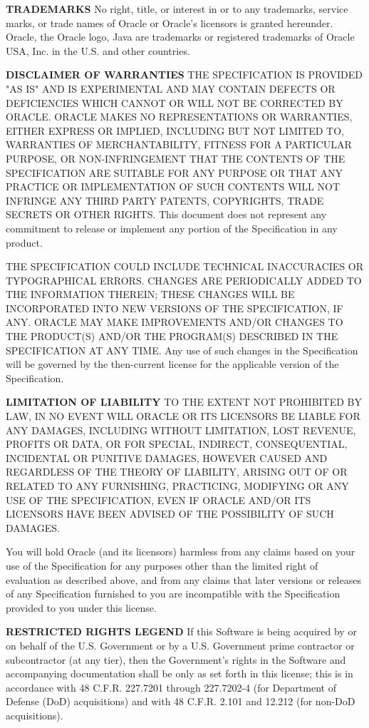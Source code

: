 \begin{flushleft}
{\bfseries TRADEMARKS}
No right, title, or interest in or to any trademarks, service marks, or trade names of Oracle or Oracle's licensors is granted hereunder. Oracle, the Oracle logo, Java are trademarks or registered trademarks of Oracle USA, Inc. in the U.S. and other countries.

{\bfseries DISCLAIMER OF WARRANTIES}
THE SPECIFICATION IS PROVIDED "AS IS" AND IS EXPERIMENTAL AND MAY CONTAIN DEFECTS OR DEFICIENCIES WHICH CANNOT OR WILL NOT BE CORRECTED BY ORACLE. ORACLE MAKES NO REPRESENTATIONS OR WARRANTIES, EITHER EXPRESS OR IMPLIED, INCLUDING BUT NOT LIMITED TO, WARRANTIES OF MERCHANTABILITY, FITNESS FOR A PARTICULAR PURPOSE, OR NON-INFRINGEMENT THAT THE CONTENTS OF THE SPECIFICATION ARE
SUITABLE FOR ANY PURPOSE OR THAT ANY PRACTICE OR IMPLEMENTATION OF SUCH CONTENTS WILL NOT INFRINGE ANY THIRD PARTY PATENTS, COPYRIGHTS, TRADE SECRETS OR OTHER RIGHTS. This document does not represent any commitment to release or implement any portion of the Specification in any product.

THE SPECIFICATION COULD INCLUDE TECHNICAL INACCURACIES OR TYPOGRAPHICAL ERRORS. CHANGES ARE PERIODICALLY ADDED TO THE INFORMATION THEREIN; THESE CHANGES WILL BE INCORPORATED INTO NEW VERSIONS OF THE SPECIFICATION, IF ANY. ORACLE MAY MAKE IMPROVEMENTS AND/OR CHANGES TO THE PRODUCT(S) AND/OR THE PROGRAM(S) DESCRIBED IN THE SPECIFICATION AT ANY TIME. Any use of such changes in the Specification will be governed by the then-current license for the applicable version of the Specification.

{\bfseries LIMITATION OF LIABILITY}
TO THE EXTENT NOT PROHIBITED BY LAW, IN NO EVENT WILL ORACLE OR ITS LICENSORS BE LIABLE FOR ANY DAMAGES, INCLUDING WITHOUT LIMITATION, LOST REVENUE, PROFITS OR DATA, OR FOR SPECIAL, INDIRECT, CONSEQUENTIAL, INCIDENTAL OR PUNITIVE DAMAGES, HOWEVER CAUSED AND REGARDLESS OF THE THEORY OF LIABILITY, ARISING OUT OF OR RELATED TO ANY FURNISHING, PRACTICING, MODIFYING OR ANY USE OF THE SPECIFICATION, EVEN IF ORACLE AND/OR ITS LICENSORS HAVE BEEN ADVISED OF THE POSSIBILITY OF SUCH DAMAGES.

You will hold Oracle (and its licensors) harmless from any claims based on your use of the Specification for any purposes other than the limited right of evaluation as described above, and from any claims that later versions or releases of any Specification furnished to you are incompatible with the Specification provided to you under this license.

{\bfseries RESTRICTED RIGHTS LEGEND}
If this Software is being acquired by or on behalf of the U.S. Government or by a U.S. Government prime contractor or subcontractor (at any tier), then the Government's rights in the Software and accompanying documentation shall be only as set forth in this license; this is in accordance with 48 C.F.R. 227.7201 through 227.7202-4 (for Department of Defense (DoD) acquisitions) and with 48 C.F.R. 2.101 and 12.212 (for non-DoD acquisitions).


\end{flushleft}
